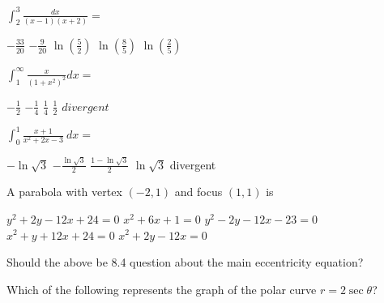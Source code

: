 \begin{questions}
\question[2] $\int_2^3 \frac{dx}{(x-1)(x+2)} = $

    \begin{oneparchoices}
    \choice  $-\frac{33}{20}$
    \choice  $-\frac{9}{20}$
    \choice  $\ln(\frac{5}{2})$
    \CorrectChoice $\ln(\frac{8}{5})$
    \choice $\ln(\frac{2}{5})$
    \end{oneparchoices}

\question[2] $\int_1^\infty \frac{x}{(1+x^2)^2} dx = $

    \begin{oneparchoices}
    \choice  $-\frac{1}{2}$
    \choice  $-\frac{1}{4}$
    \CorrectChoice  $\frac{1}{4}$
    \choice $\frac{1}{2}$
    \choice $divergent$
    \end{oneparchoices}

\question[2] $\int_0^1 \frac{x+1}{x^2 + 2x - 3}\ dx = $

    \begin{oneparchoices}
    \choice $-\ln \sqrt{3}$
    \choice $-\frac{\ln \sqrt{3}}{2}$ 
    \choice $\frac{1 - \ln \sqrt{3}}{2}$ 
    \choice $\ln \sqrt{3}$ 
    \CorrectChoice divergent 
    \end{oneparchoices}


\question[2] A parabola with vertex $(-2, 1)$ and focus $(1, 1)$ is

    \begin{oneparchoices}
    \choice $y^2 + 2y - 12x + 24 = 0$
    \choice $x^2 + 6x + 1 = 0$
    \CorrectChoice $y^2 - 2y - 12x - 23 = 0$
    \choice $x^2 + y + 12x + 24 = 0$
    \choice $x^2 + 2y - 12x = 0$
    \end{oneparchoices}

Should the above be 8.4 question about the main eccentricity equation?




\question[2] Which of the following represents the graph of the polar
    curve $r = 2\sec \theta$?


\end{questions}
